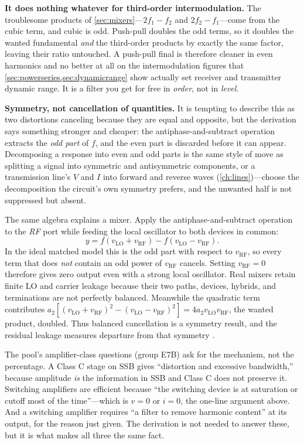 \textbf{It does nothing whatever for third-order intermodulation.} The troublesome
products of \cref{sec:mixers}---\(2f_1-f_2\) and \(2f_2-f_1\)---come from the cubic
term, and cubic is odd. Push-pull doubles the odd terms, so it doubles the wanted
fundamental \emph{and} the third-order products by exactly the same factor, leaving
their ratio untouched. A push-pull final is therefore cleaner in even harmonics and no
better at all on the intermodulation figures that
\cref{sec:powerseries,sec:dynamicrange} show actually set receiver and transmitter
dynamic range. It is a filter you get for free in \emph{order}, not in \emph{level}.

\begin{controlsbox}
\textbf{Symmetry, not cancellation of quantities.} It is tempting to describe this as
two distortions canceling because they are equal and opposite, but the derivation
says something stronger and cheaper: the antiphase-and-subtract operation extracts the
\emph{odd part} of \(f\), and the even part is discarded before it can appear.
Decomposing a response into even and odd parts is the same style of move as splitting
a signal into symmetric and antisymmetric components, or a transmission line's
\(V\) and \(I\) into forward and reverse waves (\cref{ch:lines})---choose the
decomposition the circuit's own symmetry prefers, and the unwanted half is not
suppressed but absent.
\end{controlsbox}

The same algebra explains a mixer. Apply the antiphase-and-subtract operation to the
\emph{RF} port while feeding the local oscillator to both devices in common:
\[
y=f(v_{\mathrm{LO}}+v_{\mathrm{RF}})-f(v_{\mathrm{LO}}-v_{\mathrm{RF}}) .
\]
In the ideal matched model this is the odd part with respect to
\(v_{\mathrm{RF}}\), so every term that does \emph{not} contain an odd power of
\(v_{\mathrm{RF}}\) cancels. Setting \(v_{\mathrm{RF}}=0\) therefore gives zero
output even with a strong local oscillator. Real mixers retain finite LO and carrier
leakage because their two paths, devices, hybrids, and terminations are not perfectly
balanced. Meanwhile the quadratic term contributes
\(a_2\left[(v_{\mathrm{LO}}+v_{\mathrm{RF}})^2-
(v_{\mathrm{LO}}-v_{\mathrm{RF}})^2\right]=4a_2v_{\mathrm{LO}}v_{\mathrm{RF}}\),
the wanted product, doubled. Thus balanced cancellation is a symmetry result, and
the residual leakage measures departure from that symmetry
\cite[pp.~289--317]{davis2011rfcircuit}.

\begin{exambox}
The pool's amplifier-class questions (group E7B) ask for the mechanism, not the
percentage. A Class C stage on SSB gives ``distortion and excessive bandwidth,''
because amplitude \emph{is} the information in SSB and Class C does not preserve it.
Switching amplifiers are efficient because ``the switching device is at saturation or
cutoff most of the time''---which is \(v=0\) or \(i=0\), the one-line argument above.
And a switching amplifier requires ``a filter to remove harmonic content'' at its
output, for the reason just given. The derivation is not needed to answer these, but
it is what makes all three the same fact.
\end{exambox}

